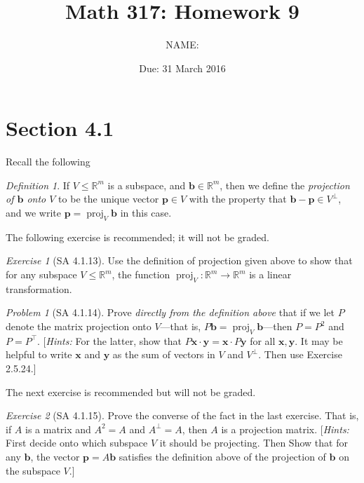 \documentclass[11pt]{paper}
\author         {NAME:                     }
\title{Math 317: Homework 9}
\date{Due: 31 March 2016}
\theoremstyle{remark}
\newtheorem{problem}{Problem}
\newtheorem*{definition}{Definition}
\newtheorem*{exercise}{Exercise}
\newtheorem*{solution}{{\bf Solution}}
\newcommand\R{\fld{R}}
\newcommand\proj{\ensuremath{\operatorname{proj}}}
\renewcommand{\vec}[1]{\mathbf{#1}}
\newcommand{\<}{\ensuremath{\langle}}
\renewcommand{\>}{\ensuremath{\rangle}}
\newcommand\fld[1]{\ensuremath{\mathbb{#1}}}
\newcommand\vb{\vec{b}}
\newcommand\vp{\vec{p}}
\newcommand\vx{\vec{x}}
\newcommand\vy{\vec{y}}
\begin{document}
\maketitle

\section*{Section 4.1}
\noindent Recall the following
\begin{definition}
If $V \leq \R^m$ is a subspace, and $\vb \in \R^m$, then we define the 
\emph{projection of $\vb$ onto $V$} to be the unique vector $\vp \in V$ 
with the property that $\vb - \vp \in V^\bot$, and we write $\vp = \proj_V\vb$
in this case.
\end{definition}

\medskip
\noindent The following exercise is recommended; it will not be graded.

\begin{exercise}[SA 4.1.13]
Use the definition of projection given above to show that for any subspace 
$V \leq \R^m$, the function $\proj_V : \R^m \to \R^m$ is a linear
transformation.  %
\end{exercise}

\probskip %
\begin{problem}[SA 4.1.14]
Prove \emph{directly from the definition above} that if 
we let $P$ denote the matrix projection onto $V$---that is, 
$P\vb = \proj_V\vb$---then $P = P^2$ and
$P = P^\top$. [{\it Hints:} For the latter, show that 
$P\vx\cdot \vy = \vx \cdot P\vy$ 
for all $\vx, \vy$. It may be helpful
to write $\vx$ and $\vy$ as the sum of vectors in 
$V$ and $V^\bot$. Then use Exercise 2.5.24.]
\end{problem}


\probskip %

\noindent The next exercise is recommended but will not be graded.
\medskip

\begin{exercise}[SA 4.1.15]
Prove the converse of the fact in the last exercise. That is,
if $A$ is a matrix and $A^2 = A$ and $A^\bot = A$, then $A$ is a projection 
matrix. [{\it Hints:} 
First decide onto which subspace $V$ it should be projecting. 
Then Show that for any $\vb$, the vector 
$\vp = A\vb$ satisfies the definition above of the projection of $\vb$ on the 
subspace $V$.]
\end{exercise}
\end{document}
